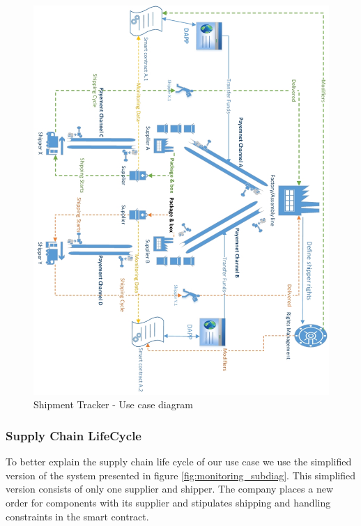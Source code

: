 \begin{figure}[h]
	\centering
    \includegraphics[width=180mm,scale=1]{figs/AbstractUC-flip}
	\caption{Shipment Tracker - Use case diagram}
	\label{fig:UseCase}
\end{figure}

\clearpage


\subsubsection{Supply Chain LifeCycle}
To better explain the supply chain life cycle of our use case we use the simplified version of the system presented in figure \ref{fig:monitoring_subdiag}. This simplified version consists of only one supplier and shipper. The company places a new order for components with its supplier and stipulates shipping and handling constraints in the smart contract. 

